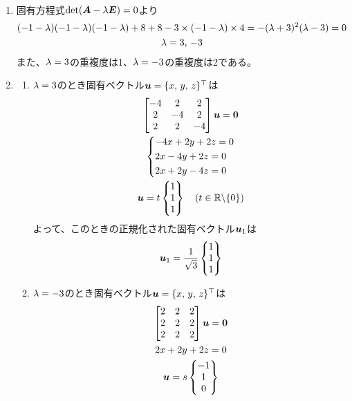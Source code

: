 \begin{ans*}
  ${}$
  \begin{enumerate}[label=(\arabic*)]
    \item 固有方程式$\det(\bm{A} - {\lambda}\bm{E}) = 0$より
    \begin{gather}
      (-1-{\lambda})(-1-{\lambda})(-1-{\lambda}) + 8 + 8 - 3\times(-1-{\lambda})\times 4 = -({\lambda} + 3)^2({\lambda} - 3) = 0 \\
      {\lambda} = 3, \, -3
    \end{gather}
    また、${\lambda} = 3$の重複度は1、${\lambda} = -3$の重複度は2である。
    \item
    \begin{enumerate}[label=(\roman*)]
      \item ${\lambda} = 3$のとき固有ベクトル${\bm{u}}=\{x,\, y,\, z\}^{\top}$は
      \begin{gather}
        \bmat{
          -4 & 2 & 2 \\
          2 & -4 & 2 \\
          2 & 2 & -4
        }\bu = \bzv \\
        \begin{dcases*}
          -4x +  2y + 2z = 0 \\
          2x -4y + 2z = 0 \\
          2x + 2y -4z = 0
        \end{dcases*} \\
        \bu = t\Bmat{
          1 \\ 1 \\ 1
        }\quad(t\in\bbR\backslash\{0\})
      \end{gather}
      よって、このときの正規化された固有ベクトル${\bm{u}}_{1}$は
      \begin{gather}
        {\bm{u}}_{1} = \frac{1}{\sqrt{3}}\begin{Bmatrix}
          1 \\ 1 \\ 1
        \end{Bmatrix}
      \end{gather}
      \item ${\lambda} = -3$のとき固有ベクトル${\bm{u}} = \{x,\,y,\,z\}^{\top}$は
      \begin{gather}
        \begin{bmatrix}
          2 & 2 & 2 \\
          2 & 2 & 2 \\
          2 & 2 & 2 \\
        \end{bmatrix}{\bm{u}} = \bm{0} \\
        2x + 2y + 2z = 0 \\
        {\bm{u}} = s \begin{Bmatrix}
          -1 \\ 1 \\ 0
\end{Bmatrix}
\end{gather}
\end{enumerate}
\end{enumerate}
\end{ans*}
